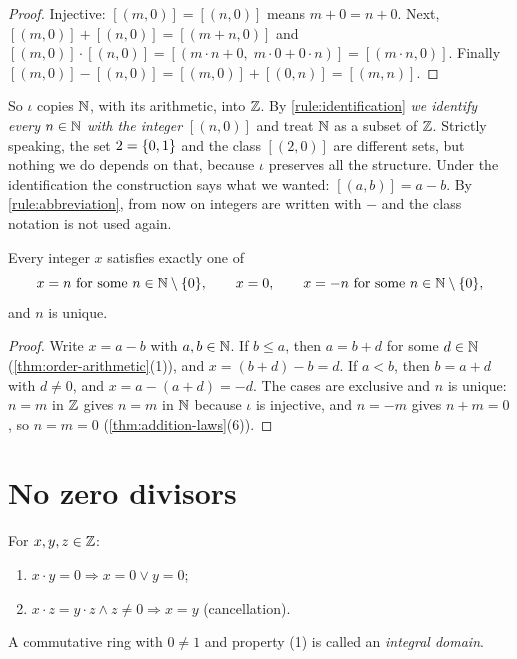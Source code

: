 \begin{proof}
Injective: $[(m, 0)] = [(n, 0)]$ means $m + 0 = n + 0$. Next, $[(m, 0)] + [(n, 0)]
= [(m + n, 0)]$ and $[(m, 0)] \cdot [(n, 0)] = [(m \cdot n + 0,\; m \cdot 0 + 0
\cdot n)] = [(m \cdot n, 0)]$. Finally $[(m, 0)] - [(n, 0)] = [(m, 0)] + [(0, n)]
= [(m, n)]$.
\end{proof}

So $\iota$ copies $\mathbb{N}$, with its arithmetic, into $\mathbb{Z}$. By
\cref{rule:identification} \emph{we identify every $n \in \mathbb{N}$ with the integer
$[(n, 0)]$} and treat $\mathbb{N}$ as a subset of $\mathbb{Z}$. Strictly speaking, the set $2 =
\lbrace 0, 1 \rbrace$ and the class $[(2, 0)]$ are different sets, but nothing we do depends
on that, because $\iota$ preserves all the structure. Under the identification
the construction says what we wanted: $[(a, b)] = a - b$. By
\cref{rule:abbreviation}, from now on integers are written with $-$ and the class
notation is not used again.

\begin{corollary}
\label{cor:integer-normal-form}
Every integer $x$ satisfies exactly one of
\[
  x = n \text{ for some } n \in \mathbb{N} \setminus \lbrace 0 \rbrace, \qquad x = 0, \qquad x = -n
  \text{ for some } n \in \mathbb{N} \setminus \lbrace 0 \rbrace,
\]
and $n$ is unique.
\end{corollary}

\begin{proof}
Write $x = a - b$ with $a, b \in \mathbb{N}$. If $b \le a$, then $a = b + d$ for some $d \in
\mathbb{N}$ (\cref{thm:order-arithmetic}(1)), and $x = (b + d) - b = d$. If $a < b$, then
$b = a + d$ with $d \neq 0$, and $x = a - (a + d) = -d$. The cases are exclusive
and $n$ is unique: $n = m$ in $\mathbb{Z}$ gives $n = m$ in $\mathbb{N}$ because $\iota$ is
injective, and $n = -m$ gives $n + m = 0$, so $n = m = 0$
(\cref{thm:addition-laws}(6)).
\end{proof}

\section{No zero divisors}

\begin{theorem}
\label{thm:integral-domain}
For $x, y, z \in \mathbb{Z}$:
\begin{enumerate}
  \item $x \cdot y = 0 \Rightarrow x = 0 \lor y = 0$;
  \item $x \cdot z = y \cdot z \land z \neq 0 \Rightarrow x = y$ (cancellation).
\end{enumerate}
A commutative ring with $0 \neq 1$ and property (1) is called an \emph{integral
domain}.
\end{theorem}

